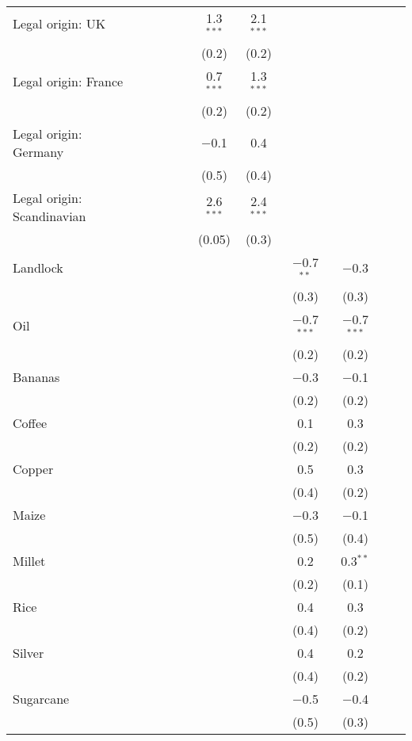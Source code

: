 {\begin{table}[]
\begin{threeparttable}
\begin{tabular}{@{\extracolsep{0pt}}lcccccccccc}
  Legal origin: UK &  &  &  &  & 1.3$^{***}$ & 2.1$^{***}$ &  &  &  &  \\ 
  &  &  &  &  & (0.2) & (0.2) &  &  &  &  \\ 
  Legal origin: France &  &  &  &  & 0.7$^{***}$ & 1.3$^{***}$ &  &  &  &  \\ 
  &  &  &  &  & (0.2) & (0.2) &  &  &  &  \\ 
  Legal origin: Germany &  &  &  &  & $-$0.1 & 0.4 &  &  &  &  \\ 
  &  &  &  &  & (0.5) & (0.4) &  &  &  &  \\ 
  Legal origin: Scandinavian &  &  &  &  & 2.6$^{***}$ & 2.4$^{***}$ &  &  &  &  \\ 
  &  &  &  &  & (0.05) & (0.3) &  &  &  &  \\ 
  Landlock &  &  &  &  &  &  & $-$0.7$^{**}$ & $-$0.3 &  &  \\ 
  &  &  &  &  &  &  & (0.3) & (0.3) &  &  \\ 
  Oil &  &  &  &  &  &  & $-$0.7$^{***}$ & $-$0.7$^{***}$ &  &  \\ 
  &  &  &  &  &  &  & (0.2) & (0.2) &  &  \\ 
  Bananas &  &  &  &  &  &  & $-$0.3 & $-$0.1 &  &  \\ 
  &  &  &  &  &  &  & (0.2) & (0.2) &  &  \\ 
  Coffee &  &  &  &  &  &  & 0.1 & 0.3 &  &  \\ 
  &  &  &  &  &  &  & (0.2) & (0.2) &  &  \\ 
  Copper &  &  &  &  &  &  & 0.5 & 0.3 &  &  \\ 
  &  &  &  &  &  &  & (0.4) & (0.2) &  &  \\ 
  Maize &  &  &  &  &  &  & $-$0.3 & $-$0.1 &  &  \\ 
  &  &  &  &  &  &  & (0.5) & (0.4) &  &  \\ 
  Millet &  &  &  &  &  &  & 0.2 & 0.3$^{**}$ &  &  \\ 
  &  &  &  &  &  &  & (0.2) & (0.1) &  &  \\ 
  Rice &  &  &  &  &  &  & 0.4 & 0.3 &  &  \\ 
  &  &  &  &  &  &  & (0.4) & (0.2) &  &  \\ 
  Silver &  &  &  &  &  &  & 0.4 & 0.2 &  &  \\ 
  &  &  &  &  &  &  & (0.4) & (0.2) &  &  \\ 
  Sugarcane &  &  &  &  &  &  & $-$0.5 & $-$0.4 &  &  \\ 
  &  &  &  &  &  &  & (0.5) & (0.3) &  &  \\ 

\end{tabular}
\end{threeparttable}
\end{table}}

